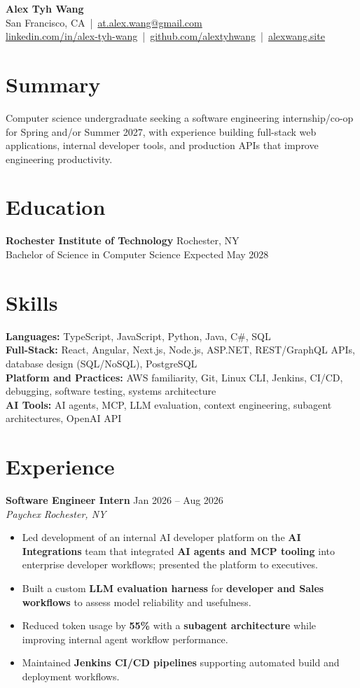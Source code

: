 \documentclass[10pt,letterpaper]{article}
\newif\ifresumeFirstRole
\newcommand{\resumeRole}[4]{%
  \ifresumeFirstRole
    \global\resumeFirstRolefalse
  \else
    \vspace{0pt plus 1fill}%
  \fi
  \textbf{#1} \hfill #2\\
  \textit{#3} \hfill \textit{#4}
}
\begin{document}
\begin{center}
{\Large \textbf{Alex Tyh Wang}}\\
San Francisco, CA \,|\, \href{mailto:at.alex.wang@gmail.com}{at.alex.wang@gmail.com}\\
\small \href{https://www.linkedin.com/in/alex-tyh-wang/}{linkedin.com/in/alex-tyh-wang} \,|\, \href{https://github.com/alextyhwang}{github.com/alextyhwang} \,|\, \href{https://alexwang.site}{alexwang.site}
\end{center}

\section*{Summary}
Computer science undergraduate seeking a software engineering internship/co-op for Spring and/or Summer 2027, with experience building full-stack web applications, internal developer tools, and production APIs that improve engineering productivity.

\section*{Education}
\textbf{Rochester Institute of Technology} \hfill Rochester, NY\\
Bachelor of Science in Computer Science \hfill Expected May 2028

\section*{Skills}
\textbf{Languages:} TypeScript, JavaScript, Python, Java, C\#, SQL\\
\textbf{Full-Stack:} React, Angular, Next.js, Node.js, ASP.NET, REST/GraphQL APIs, database design (SQL/NoSQL), PostgreSQL\\
\textbf{Platform and Practices:} AWS familiarity, Git, Linux CLI, Jenkins, CI/CD, debugging, software testing, systems architecture\\
\textbf{AI Tools:} AI agents, MCP, LLM evaluation, context engineering, subagent architectures, OpenAI API

\section*{Experience}
\resumeRole{Software Engineer Intern}{Jan 2026 -- Aug 2026}{Paychex}{Rochester, NY}
\begin{itemize}
  \item Led development of an internal AI developer platform on the \textbf{AI Integrations} team that integrated \textbf{AI agents and MCP tooling} into enterprise developer workflows; presented the platform to executives.
  \item Built a custom \textbf{LLM evaluation harness} for \textbf{developer and Sales workflows} to assess model reliability and usefulness.
  \item Reduced token usage by \textbf{55\%} with a \textbf{subagent architecture} while improving internal agent workflow performance.
  \item Maintained \textbf{Jenkins CI/CD pipelines} supporting automated build and deployment workflows.
\end{itemize}
\end{document}
